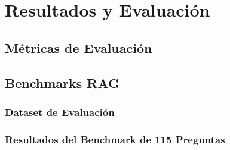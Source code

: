 
\section{Resultados y Evaluaci\'on}
\label{sec:resultados}


\subsection{M\'etricas de Evaluaci\'on}
\label{subsec:metricas-evaluacion}


\subsection{Benchmarks RAG}
\label{subsec:benchmarks-rag}

\subsubsection{Dataset de Evaluaci\'on}
\label{subsubsec:dataset-evaluacion}


\subsubsection{Resultados del Benchmark de 115 Preguntas}
\label{subsubsec:benchmark-115}

